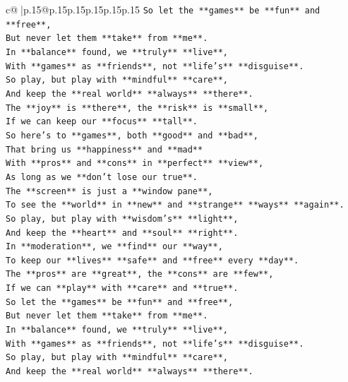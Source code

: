 \documentclass{article}
\begin{document}
{\begin{supertabular}{c@{$\;$}|p{.15\linewidth}@{}p{.15\linewidth}p{.15\linewidth}p{.15\linewidth}p{.15\linewidth}p{.15\linewidth}}
{{{\texttt{So let the **games** be **fun** and **free**,} \\
\texttt{But never let them **take** from **me**.} \\
\texttt{In **balance** found, we **truly** **live**,} \\
\texttt{With **games** as **friends**, not **life's** **disguise**.} \\
\texttt{So play, but play with **mindful** **care**,} \\
\texttt{And keep the **real world** **always** **there**.} \\
\texttt{The **joy** is **there**, the **risk** is **small**,} \\
\texttt{If we can keep our **focus** **tall**.} \\
\texttt{So here's to **games**, both **good** and **bad**,} \\
\texttt{That bring us **happiness** and **mad**} \\
\texttt{With **pros** and **cons** in **perfect** **view**,} \\
\texttt{As long as we **don't lose our true**.} \\
\texttt{The **screen** is just a **window pane**,} \\
\texttt{To see the **world** in **new** and **strange** **ways** **again**.} \\
\texttt{So play, but play with **wisdom's** **light**,} \\
\texttt{And keep the **heart** and **soul** **right**.} \\
\texttt{In **moderation**, we **find** our **way**,} \\
\texttt{To keep our **lives** **safe** and **free** every **day**.} \\
\texttt{The **pros** are **great**, the **cons** are **few**,} \\
\texttt{If we can **play** with **care** and **true**.} \\
\texttt{So let the **games** be **fun** and **free**,} \\
\texttt{But never let them **take** from **me**.} \\
\texttt{In **balance** found, we **truly** **live**,} \\
\texttt{With **games** as **friends**, not **life's** **disguise**.} \\
\texttt{So play, but play with **mindful** **care**,} \\
\texttt{And keep the **real world** **always** **there**.} \\
}}}
\end{supertabular}}
\end{document}
